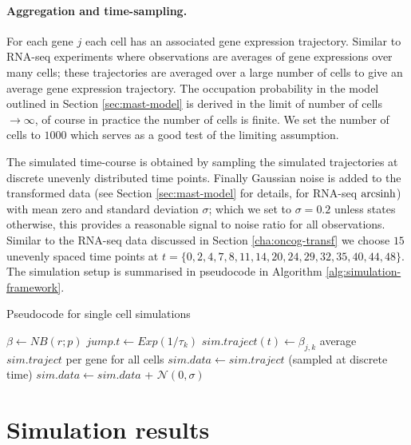 \paragraph{Aggregation and time-sampling.}
\label{sec:aggr-time-sampl}
For each gene $j$ each cell has an associated gene expression trajectory. Similar to RNA-seq experiments where observations are averages of gene expressions over many cells; these trajectories are averaged over a large number of cells to give an average gene expression trajectory. The occupation probability in the model outlined in Section \ref{sec:mast-model} is derived in the limit of number of cells $\rightarrow \infty$, of course in practice the number of cells is finite. We set the number of cells to $1000$ which serves as a good test of the limiting assumption.

The simulated time-course is obtained by sampling the simulated trajectories at discrete unevenly distributed time points. Finally Gaussian noise is added to the transformed data (see Section \ref{sec:mast-model} for details, for RNA-seq $\operatorname{arcsinh}$) with mean zero and standard deviation $\sigma$; which we set to $\sigma=0.2$ unless states otherwise, this provides a reasonable signal to noise ratio for all observations. Similar to the RNA-seq data discussed in Section \ref{cha:oncog-transf} we choose $15$ unevenly spaced  time points at $t=\lbrace 0,  2,  4,  7,  8, 11, 14, 20, 24, 29, 32, 35, 40, 44, 48\rbrace$. The simulation setup is summarised in pseudocode in Algorithm \ref{alg:simulation-framework}. 


\begin{algorithm}
    \caption{Pseudocode for single cell simulations}\label{alg:simulation-framework}
    \begin{algorithmic}[0]
        \State $\beta \gets   NB(r;p)$
        \State $jump.t \gets Exp(1/\tau_k)$
        \State $sim.traject(t) \gets \beta_{j,k}$
        \EndWhile
        \EndFor
        \EndFor
        \State average $sim.traject$ per gene for all cells
        \State $sim.data \gets sim.traject$ (sampled at discrete time)
        \State $sim.data \gets sim.data$ + $\mathcal{N}(0, \sigma)$
        \EndProcedure
      \end{algorithmic}
\end{algorithm}

\section{Simulation results}
\label{sec:results}

